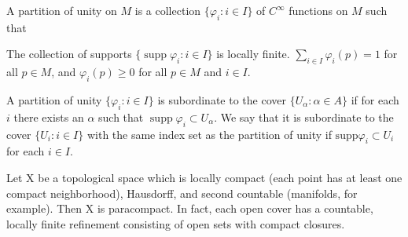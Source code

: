 \begin{definition}\label{thm:1.8}
	A partition of unity on $M$ is a collection $\{\varphi_i: i \in I\}$ of $C^\infty$ functions on $M$ such that
	\begin{enumerate}
		 The collection of supports $\{\operatorname{supp}\varphi_{i}: i \in I\}$ is locally finite.
		  $ \sum_{i\in I}\varphi_i(p)=1 $ for all  $ p\in M $, and  $ \varphi_i(p)\geq0 $ for all  $ p\in M $ and  $ i\in I $.
	\end{enumerate}
	A partition of unity $\{\varphi_i: i \in I\}$ is subordinate
	to the cover $\{U_\alpha: \alpha \in A\}$ if for each
	$i$ there exists an $\alpha$ such that
	$\operatorname{supp}\varphi_i \subset U_\alpha$. We say that it
	is subordinate to the cover $\{U_i: i \in I\}$ with the same
	index set as the partition of unity if $\text{supp} \varphi_i
		\subset U_i$ for each $i \in I$.
\end{definition}

\begin{lemma}\label{thm:1.9}
	Let X be a topological space which is locally compact
	(each point has at least one compact neighborhood), Hausdorff,
	and second countable (manifolds, for example).
	Then X is paracompact. In fact, each open cover has a countable,
	locally finite refinement consisting of open sets with compact closures.
\end{lemma}

